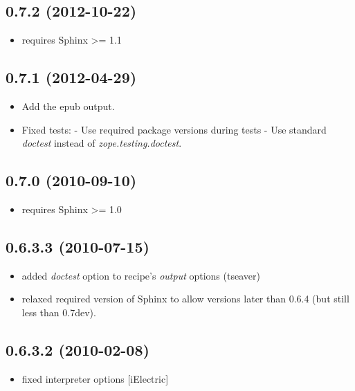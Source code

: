 \documentclass[letterpaper,10pt,english]{sphinxmanual}
\begin{document}
\subsection{0.7.2 (2012-10-22)}
\label{history:id6}\begin{itemize}
\item {} 
requires Sphinx \textgreater{}= 1.1

\end{itemize}


\subsection{0.7.1 (2012-04-29)}
\label{history:id7}\begin{itemize}
\item {} 
Add the epub output.

\item {} 
Fixed tests:
- Use required package versions during tests
- Use standard \emph{doctest} instead of \emph{zope.testing.doctest}.

\end{itemize}


\subsection{0.7.0 (2010-09-10)}
\label{history:id8}\begin{itemize}
\item {} 
requires Sphinx \textgreater{}= 1.0

\end{itemize}


\subsection{0.6.3.3 (2010-07-15)}
\label{history:id9}\begin{itemize}
\item {} 
added \emph{doctest} option to recipe's \emph{output} options (tseaver)

\item {} 
relaxed required version of Sphinx to allow versions later than
0.6.4 (but still less than 0.7dev).

\end{itemize}


\subsection{0.6.3.2 (2010-02-08)}
\label{history:id10}\begin{itemize}
\item {} 
fixed interpreter options {[}iElectric{]}

\end{itemize}
\end{document}
